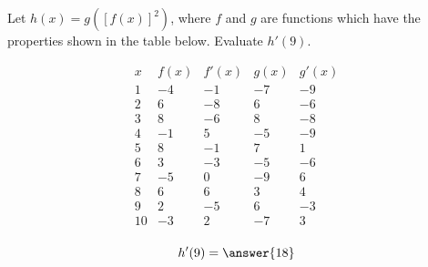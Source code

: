 \documentclass{ximera}
\author{Steven Gubkin}
\begin{document}
\begin{exercise}


Let $h(x) = g(\left[f(x)\right]^2)$, where $f$ and $g$ are functions which have the properties shown in the table below.  Evaluate $h'(9)$.

\[
\begin{array}{c|c|c|c|c}
 x & f(x) & f'(x) & g(x) & g'(x)\\ \hline
1 & -4 & -1 & -7 & -9\\
2 & 6 & -8 & 6 & -6\\
3 & 8 & -6 & 8 & -8\\
4 & -1 & 5 & -5 & -9\\
5 & 8 & -1 & 7 & 1\\
6 & 3 & -3 & -5 & -6\\
7 & -5 & 0 & -9 & 6\\
8 & 6 & 6 & 3 & 4\\
9 & 2 & -5 & 6 & -3\\
10 & -3 & 2 & -7 & 3\\
\end{array}
\]


\begin{prompt}
	$$h'(9) = \answer{18}$$
\end{prompt}


\end{exercise}
\end{document}
